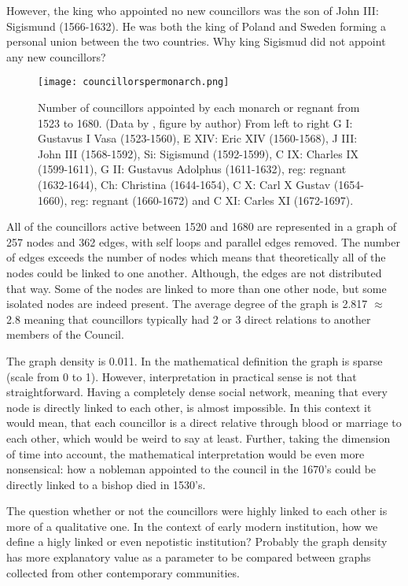 However, the king who appointed no new councillors was the son of John III: Sigismund (1566-1632). He was both the king of Poland and Sweden forming a personal union between the two countries. Why king Sigismud did not appoint any new councillors? 

\begin{figure}
	\texttt{[image: councillorspermonarch.png]}
	\centering
	\caption[Number of councillors appointed by each ruler between 1523-1680] {Number of councillors appointed by each monarch or regnant from 1523 to 1680. (Data by \cite{councillorsDS}, figure by author) From left to right G I: Gustavus I Vasa (1523-1560), E XIV: Eric XIV (1560-1568), J III: John III (1568-1592), Si: Sigismund (1592-1599), C IX: Charles IX (1599-1611), G II: Gustavus Adolphus (1611-1632), reg: regnant (1632-1644), Ch: Christina (1644-1654), C X: Carl X Gustav (1654-1660), reg: regnant (1660-1672) and C XI: Carles XI (1672-1697).}
	\centering
\end{figure}

All of the councillors active between 1520 and 1680 are represented in a graph of 257 nodes and 362 edges, with self loops and parallel edges removed. The number of edges exceeds the number of nodes which means that theoretically all of the nodes could be linked to one another. Although, the edges are not distributed that way. Some of the nodes are linked to more than one other node, but some isolated nodes are indeed present. The average degree of the graph is 2.817 $\approx$ 2.8 meaning that councillors typically had 2 or 3 direct relations to another members of the Council.

The graph density is 0.011. In the mathematical definition the graph is sparse (scale from 0 to 1). However, interpretation in practical sense is not that straightforward. Having a completely dense social network, meaning that every node is directly linked to each other, is almost impossible. In this context it would mean, that each councillor is a direct relative through blood or marriage to each other, which would be weird to say at least. Further, taking the dimension of time into account, the mathematical interpretation would be even more nonsensical: how a nobleman appointed to the council in the 1670's could be directly linked to a bishop died in 1530's. 

The question whether or not the councillors were highly linked to each other is more of a qualitative one. In the context of early modern institution, how we define a higly linked or even nepotistic institution? Probably the graph density has more explanatory value as a parameter to be compared between graphs collected from other contemporary communities.

